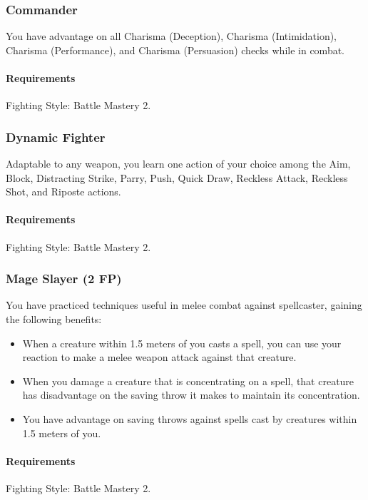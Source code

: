 \subsubsection{Commander} \label{feat::commander}
    You have advantage on all Charisma (Deception), Charisma (Intimidation), Charisma (Performance), and Charisma (Persuasion) checks while in combat.
    \paragraph{Requirements} Fighting Style: Battle Mastery 2.
\subsubsection{Dynamic Fighter} \label{feat::dynamicfighter}
    Adaptable to any weapon, you learn one action of your choice among the Aim, Block, Distracting Strike, Parry, Push, Quick Draw, Reckless Attack, Reckless Shot, and Riposte actions.
    \paragraph{Requirements} Fighting Style: Battle Mastery 2.
\subsubsection{Mage Slayer (2 FP)} \label{feat::mageslayer}
    You have practiced techniques useful in melee combat against spellcaster, gaining the following benefits:
    \begin{itemize}
        \item When a creature within 1.5 meters of you casts a spell, you can use your reaction to make a melee weapon attack against that creature.
        \item When you damage a creature that is concentrating on a spell, that creature has disadvantage on the saving throw it makes to maintain its concentration.
        \item You have advantage on saving throws against spells cast by creatures within 1.5 meters of you.
    \end{itemize}
    \paragraph{Requirements} Fighting Style: Battle Mastery 2.

